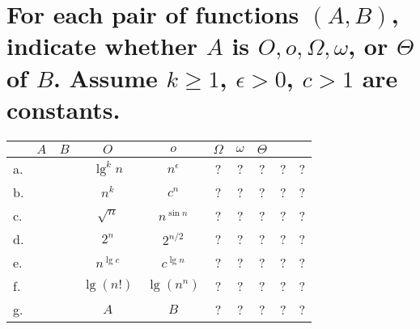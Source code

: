 \section[Problem 5]{For each pair of functions $(A, B)$, indicate whether $A$ is $O, o, \Omega, \omega$, or $\Theta$ of $B$. Assume $k \geq 1$, $\epsilon > 0$, $c > 1$ are constants.}
\begin{center}
	\begin{tabular}{lcc|c|c|c|c|c}
		& $A$ & $B$ & $O$ & $o$ & $\Omega$ & $\omega$ & $\Theta$ \\ \hline
		a. && & $\lg^k n$ & $n^{\epsilon}$ & ? & ? & ? & ? & ? \\ \hline
		b. && & $n^k$ & $c^n$ & ? & ? & ? & ? & ? \\ \hline
		c. && & $\sqrt{n}$ & $n^{\sin n}$ & ? & ? & ? & ? & ? \\ \hline
		d. && & $2^n$ & $2^{n/2}$ & ? & ? & ? & ? & ? \\ \hline
		e. && & $n^{\lg c}$ & $c^{\lg n}$ & ? & ? & ? & ? & ? \\ \hline
		f. && & $\lg(n!)$ & $\lg(n^n)$ & ? & ? & ? & ? & ? \\ \hline
		g. && & $A$ & $B$ & ? & ? & ? & ? & ?
	\end{tabular}
\end{center}


